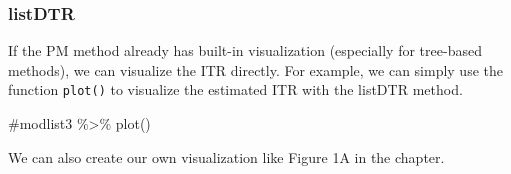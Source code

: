 \documentclass[
  letterpaper,
  DIV=11,
  numbers=noendperiod]{scrreprt}
\newenvironment{Shaded}{\begin{snugshade}}{\end{snugshade}}
\newcommand{\CommentTok}[1]{\textcolor[rgb]{0.37,0.37,0.37}{#1}}
\begin{document}
\hypertarget{listdtr}{%
\subsubsection{listDTR}\label{listdtr}}

If the PM method already has built-in visualization (especially for
tree-based methods), we can visualize the ITR directly. For example, we
can simply use the function \texttt{plot()} to visualize the estimated
ITR with the listDTR method.

\begin{Shaded}
\begin{Highlighting}[]
\CommentTok{\#modlist3 \%\textgreater{}\% plot()}
\end{Highlighting}
\end{Shaded}

We can also create our own visualization like Figure 1A in the chapter.
\end{document}

